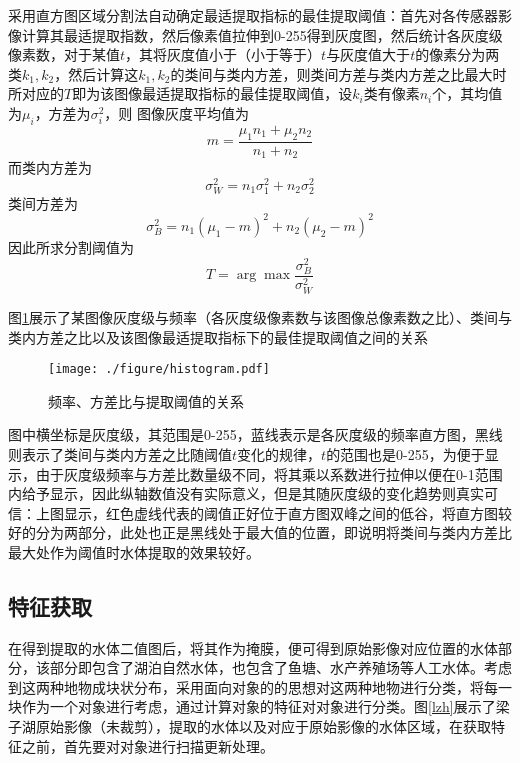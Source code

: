 \documentclass[supercite]{upcthesis}
\begin{document}
采用直方图区域分割法\cite{贾永红2010数字图像处理}自动确定最适提取指标的最佳提取阈值：首先对各传感器影像计算其最适提取指数，然后像素值拉伸到0-255得到灰度图，然后统计各灰度级像素数，对于某值$t$，其将灰度值小于（小于等于）$t$与灰度值大于$t$的像素分为两类$k_1,k_2$，然后计算这$k_1,k_2$的类间与类内方差，则类间方差与类内方差之比最大时所对应的$T$即为该图像最适提取指标的最佳提取阈值，设$k_i$类有像素$n_i$个，其均值为$\mu_i$，方差为$\sigma_{i}^2$，则
图像灰度平均值为
\begin{equation}
m=\frac{\mu_1n_1+\mu_2n_2}{n_1+n_2}
\end{equation}
而类内方差为
\begin{equation}
\sigma_W^2=n_1\sigma_1^2+n_2\sigma_2^2
\end{equation}
类间方差为
\begin{equation}
\sigma_B^2=n_1(\mu_1-m)^2+n_2(\mu_2-m)^2
\end{equation}
因此所求分割阈值为
\begin{equation}
T=\arg \max\frac{\sigma_B^2}{\sigma_W^2}
\end{equation}

图\ref{histogram}展示了某图像灰度级与频率（各灰度级像素数与该图像总像素数之比）、类间与类内方差之比以及该图像最适提取指标下的最佳提取阈值之间的关系
\begin{figure}[htbp]
	\centering
	\texttt{[image: ./figure/histogram.pdf]}
	\caption{频率、方差比与提取阈值的关系}
	\label{histogram}
\end{figure}

图中横坐标是灰度级，其范围是0-255，蓝线表示是各灰度级的频率直方图，黑线则表示了类间与类内方差之比随阈值$t$变化的规律，$t$的范围也是0-255，为便于显示，由于灰度级频率与方差比数量级不同，将其乘以系数进行拉伸以便在0-1范围内给予显示，因此纵轴数值没有实际意义，但是其随灰度级的变化趋势则真实可信：上图显示，红色虚线代表的阈值正好位于直方图双峰之间的低谷，将直方图较好的分为两部分，此处也正是黑线处于最大值的位置，即说明将类间与类内方差比最大处作为阈值时水体提取的效果较好。
\subsection{特征获取}
在得到提取的水体二值图后，将其作为掩膜，便可得到原始影像对应位置的水体部分，该部分即包含了湖泊自然水体，也包含了鱼塘、水产养殖场等人工水体。考虑到这两种地物成块状分布，采用面向对象的的思想对这两种地物进行分类，将每一块作为一个对象进行考虑，通过计算对象的特征对对象进行分类。图\ref{lzh}展示了梁子湖原始影像（未裁剪），提取的水体以及对应于原始影像的水体区域，在获取特征之前，首先要对对象进行扫描更新处理。
\begin{figure*}
	\centering
	\caption{原始影像及提取结果}
	\label{lzh}
\end{figure*}
\end{document}
